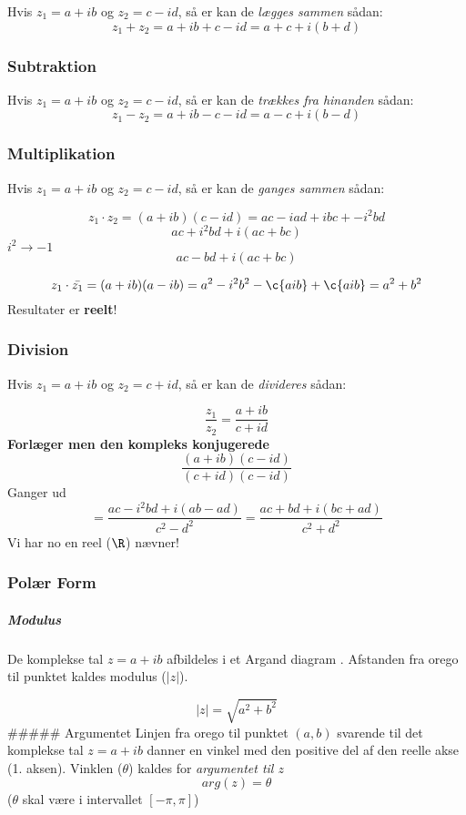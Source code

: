 Hvis \(z_1 = a+ib\) og \(z_2 = c-id\), så er kan de \emph{lægges sammen}
sådan: \[z_1 + z_2 = a + ib + c-id = a+c+i(b+d)\]

\hypertarget{subtraktion}{%
\subsubsection{Subtraktion}\label{subtraktion}}

Hvis \(z_1 = a+ib\) og \(z_2 = c-id\), så er kan de \emph{trækkes fra
hinanden} sådan: \[z_1 - z_2 = a + ib - c-id = a-c+i(b-d)\]

\hypertarget{multiplikation}{%
\subsubsection{Multiplikation}\label{multiplikation}}

Hvis \(z_1 = a+ib\) og \(z_2 = c-id\), så er kan de \emph{ganges sammen}
sådan:

\[z_1 \cdot  z_2 = (a+ib)(c-id) = ac - iad + ibc + - i^2bd\]
\[ac + i^2bd + i(ac+bc)\] \(i^2 \rightarrow -1\) \[ac - bd + i(ac+bc)\]

\[z_1 \cdot  \bar{z_1} = (a+ib)(a-ib) = a^2 - i^2b^2 - \c{aib} + \c{aib} = a^2 + b^2\]
Resultater er \textbf{reelt}!

\hypertarget{division}{%
\subsubsection{Division}\label{division}}

Hvis \(z_1 = a+ib\) og \(z_2 = c+id\), så er kan de \emph{divideres}
sådan:

\[\frac{z_1}{z_2} = \frac{a + ib}{c + id}\] \textbf{Forlæger men den
kompleks konjugerede} \[\frac{(a+ib)(c-id)}{(c+id)(c-id)}\] Ganger ud
\[= \frac{ac -i^2bd + i(ab-ad)}{c^2-d^2} = \frac{ac+bd+i(bc+ad)}{c^2 + d^2}\]
Vi har no en reel (\(\R\)) nævner!

\hypertarget{poluxe6r-form}{%
\subsubsection{Polær Form}\label{poluxe6r-form}}

\hypertarget{modulus}{%
\subparagraph{Modulus}\label{modulus}}

De komplekse tal \(z=a+ib\) afbildeles i et Argand diagram . Afstanden
fra orego til punktet kaldes modulus (\(|z|\)).

\[|z| = \sqrt{a^2 + b^2}\] \#\#\#\#\# Argumentet Linjen fra orego til
punktet \((a,b)\) svarende til det komplekse tal \(z = a+ib\) danner en
vinkel med den positive del af den reelle akse (1. aksen). Vinklen
(\(\theta\)) kaldes for \emph{argumentet til \(z\)} \[arg(z) = \theta\]
(\(\theta\) skal være i intervallet \([-\pi,\pi]\))

